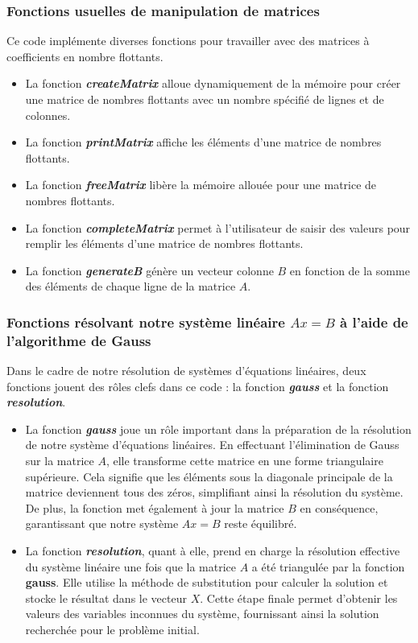 \documentclass{report}
\begin{document}
\subsubsection{Fonctions usuelles de manipulation de matrices}\label{fonctusu}
Ce code implémente diverses fonctions pour travailler avec des matrices à coefficients en nombre flottants.\\
\begin{itemize}
\item La fonction \textit{\textbf{createMatrix}} alloue dynamiquement de la mémoire pour créer une matrice de nombres flottants avec un nombre spécifié de lignes et de colonnes.
\item La fonction \textit{\textbf{printMatrix}} affiche les éléments d'une matrice de nombres flottants.
\item La fonction \textit{\textbf{freeMatrix}} libère la mémoire allouée pour une matrice de nombres flottants.
\item La fonction \textit{\textbf{completeMatrix}} permet à l'utilisateur de saisir des valeurs pour remplir les éléments d'une matrice de nombres flottants.
\item La fonction \textit{\textbf{generateB}} génère un vecteur colonne $B$ en fonction de la somme des éléments de chaque ligne de la matrice $A$.
\end{itemize}

\subsubsection{Fonctions résolvant notre système linéaire $Ax=B$ à l'aide de l'algorithme de Gauss}
Dans le cadre de notre résolution de systèmes d'équations linéaires, deux fonctions jouent des rôles clefs dans ce code : la fonction \textit{\textbf{gauss}} et la fonction \textit{\textbf{resolution}}.\\

\begin{itemize}
\item La fonction \textit{\textbf{gauss}} joue un rôle important dans la préparation de la résolution de notre système d'équations linéaires. En effectuant l'élimination de Gauss sur la matrice $A$, elle transforme cette matrice en une forme triangulaire supérieure. Cela signifie que les éléments sous la diagonale principale de la matrice deviennent tous des zéros, simplifiant ainsi la résolution du système. De plus, la fonction met également à jour la matrice $B$ en conséquence, garantissant que notre système $Ax=B$ reste équilibré.\\

\item La fonction \textit{\textbf{resolution}}, quant à elle, prend en charge la résolution effective du système linéaire une fois que la matrice $A$ a été triangulée par la fonction \textbf{gauss}. Elle utilise la méthode de substitution pour calculer la solution et stocke le résultat dans le vecteur $X$. Cette étape finale permet d'obtenir les valeurs des variables inconnues du système, fournissant ainsi la solution recherchée pour le problème initial.\\
\end{itemize}
\end{document}
